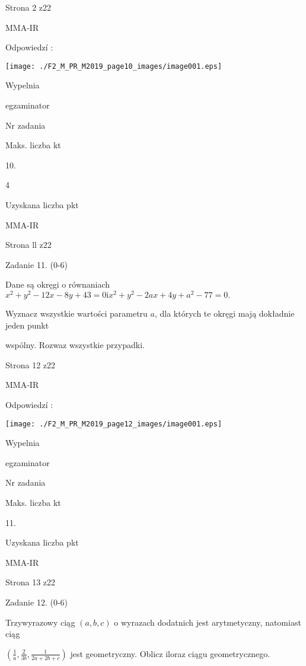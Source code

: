 \documentclass[a4paper,12pt]{article}
\begin{document}
Strona 2 z22

MMA-IR





Odpowiedzí :
\begin{center}
\texttt{[image: ./F2\_M\_PR\_M2019\_page10\_images/image001.eps]}
\end{center}
Wypelnia

egzaminator

Nr zadania

Maks. liczba kt

10.

4

Uzyskana liczba pkt

MMA-IR

Strona ll z22





Zadanie 11. (0-6)

Dane są okręgi o równaniach $x^{2}+y^{2}-12x-8y+43=0 \mathrm{i} x^{2}+y^{2}-2ax+4y+a^{2}-77=0.$

Wyznacz wszystkie wartości parametru $a$, dla których te okręgi mają dokładnie jeden punkt

wspólny. Rozwaz wszystkie przypadki.

Strona 12 z22

MMA-IR





Odpowiedzí :
\begin{center}
\texttt{[image: ./F2\_M\_PR\_M2019\_page12\_images/image001.eps]}
\end{center}
Wypelnia

egzaminator

Nr zadania

Maks. liczba kt

11.

Uzyskana liczba pkt

MMA-IR

Strona 13 z22





Zadanie 12. (0-6)

Trzywyrazowy ciąg $(a,b,c)$ o wyrazach dodatnich jest arytmetyczny, natomiast ciąg

$(\displaystyle \frac{1}{a},\frac{2}{3b},\frac{1}{2a+2b+c})$ jest geometryczny. Oblicz iloraz ciągu geometrycznego.
\end{document}
